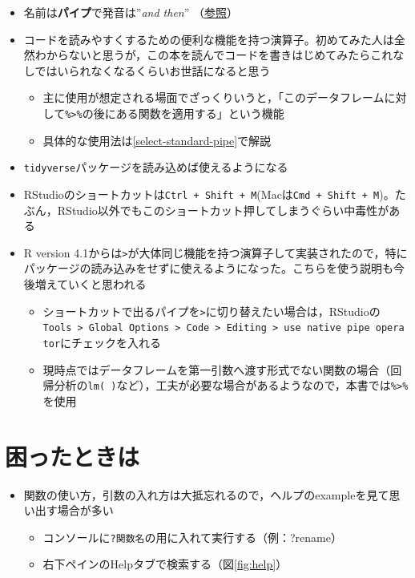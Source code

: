\documentclass[
  xelatex,ja=standard, b5paper]{bxjsbook}
\providecommand{\tightlist}{%
  \setlength{\itemsep}{0pt}\setlength{\parskip}{0pt}}
\begin{document}
\begin{itemize}
\tightlist
\item
  名前は\textbf{パイプ}で発音は''\emph{and then}'' （\href{https://adv-r.hadley.nz/functions.html\#function-composition}{参照}）
\item
  コードを読みやすくするための便利な機能を持つ演算子。初めてみた人は全然わからないと思うが，この本を読んでコードを書きはじめてみたらこれなしではいられなくなるくらいお世話になると思う

  \begin{itemize}
  \tightlist
  \item
    主に使用が想定される場面でざっくりいうと，「このデータフレームに対して\texttt{\%\textgreater{}\%}の後にある関数を適用する」という機能
  \item
    具体的な使用法は\ref{select-standard-pipe}で解説
  \end{itemize}
\item
  \texttt{tidyverse}パッケージを読み込めば使えるようになる
\item
  RStudioのショートカットは\texttt{Ctrl\ +\ Shift\ +\ M}(Macは\texttt{Cmd\ +\ Shift\ +\ M})。たぶん，RStudio以外でもこのショートカット押してしまうぐらい中毒性がある
\item
  R version 4.1からは\texttt{\textbar{}\textgreater{}}が大体同じ機能を持つ演算子して実装されたので，特にパッケージの読み込みをせずに使えるようになった。こちらを使う説明も今後増えていくと思われる

  \begin{itemize}
  \tightlist
  \item
    ショートカットで出るパイプを\texttt{\textbar{}\textgreater{}}に切り替えたい場合は，RStudioの\texttt{Tools\ \textgreater{}\ Global\ Options\ \textgreater{}\ Code\ \textgreater{}\ Editing\ \textgreater{}\ use\ native\ pipe\ operator}にチェックを入れる
  \item
    現時点ではデータフレームを第一引数へ渡す形式でない関数の場合（回帰分析の\texttt{lm(\ )}など），工夫が必要な場合があるようなので，本書では\texttt{\%\textgreater{}\%}を使用
  \end{itemize}
\end{itemize}

\hypertarget{p-help}{%
\section{困ったときは}\label{p-help}}

\begin{itemize}
\tightlist
\item
  関数の使い方，引数の入れ方は大抵忘れるので，ヘルプのexampleを見て思い出す場合が多い

  \begin{itemize}
  \tightlist
  \item
    コンソールに\texttt{?関数名}の用に入れて実行する（例：?rename）
  \item
    右下ペインのHelpタブで検索する（図\ref{fig:help}）
  \end{itemize}
\end{itemize}
\end{document}
